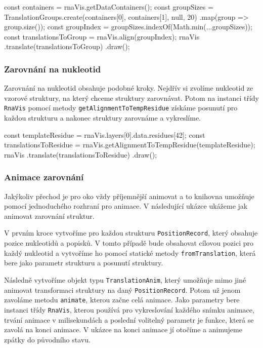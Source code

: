 \begin{code}
const containers = rnaVis.getDataContainers();
const groupSizes = 
  TranslationGroups.create(containers[0], containers[1], null, 20)
  .map(group => group.size());
const groupIndex = groupSizes.indexOf(Math.min(...groupSizes));
const translationsToGroup = rnaVis.align(groupIndex);
rnaVis
  .translate(translationsToGroup)
  .draw();
\end{code}

\subsubsection{Zarovnání na nukleotid}

Zarovnání na nukleotid obsahuje podobné kroky. Nejdřív si zvolíme nukleotid ze
vzorové struktury, na který chceme struktury zarovnávat. Potom na instanci
třídy \texttt{RnaVis} pomocí metody \texttt{getAlignmentToTempResidue} získáme
posunutí pro každou strukturu a nakonec struktury zarovnáme a vykreslíme.

\begin{code}
const templateResidue = rnaVis.layers[0].data.residues[42];
const translationsToResidue = 
  rnaVis.getAlignmentToTempResidue(templateResidue);
rnaVis
  .translate(translationsToResidue)
  .draw();
\end{code}

\subsubsection{Animace zarovnání}

Jakýkoliv přechod je pro oko vždy příjemnější animovat a to knihovna umožňuje
pomocí jednoduchého rozhraní pro animace. V následující ukázce ukážeme jak
animovat zarovnání struktur.

V prvním kroce vytvoříme pro každou strukturu \texttt{PositionRecord}, který
obsahuje pozice nukleotidů a popisků. V tomto případě bude obsahovat cílovou
pozici pro každý nukleotid a vytvoříme ho pomocí statické metody
\texttt{fromTranslation}, která bere jako parametr strukturu a posunutí
struktury.

Následně vytvoříme objekt typu \texttt{TranslationAnim}, který umožňuje mimo
jiné animovat transformaci struktury na daný \texttt{PositionRecord}. Potom už
jenom zavoláme metodu \texttt{animate}, kterou začne celá animace. Jako
parametry bere instanci třídy \texttt{RnaVis}, kterou používá pro vykreslování
každého snímku animace, trvání animace v milisekundách a poslední volitelný
parametr je funkce, která se zavolá na konci animace. V ukázce na konci animace
jí otočíme a animujeme zpátky do původního stavu.

